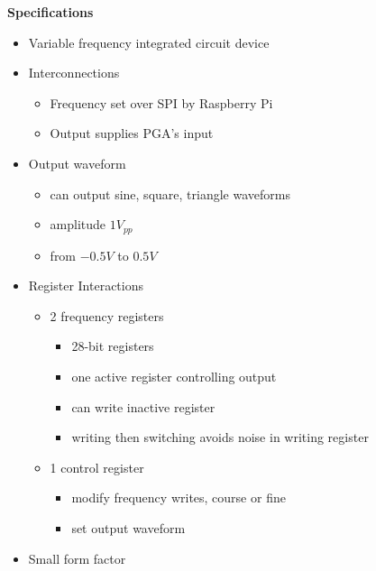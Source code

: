 \documentclass[25pt, a0paper, portrait, margin=0mm, innermargin=15mm, blockverticalspace=15mm, colspace=15mm, subcolspace=8mm]{tikzposter}
\begin{document}
\begin{columns}
{\begin{multicols}{2}
\textbf{Specifications}
\begin{itemize}
\item Variable frequency integrated circuit device
\item Interconnections
  \begin{itemize}
  \item Frequency set over SPI by Raspberry Pi
  \item Output supplies PGA's input
  \end{itemize}
\item Output waveform
  \begin{itemize}
  \item can output sine, square, triangle waveforms
  \item amplitude $1V_{pp}$
  \item from $-0.5V$ to $0.5V$ 
  \end{itemize}
\item Register Interactions
  \begin{itemize}
  \item 2 frequency registers
    \begin{itemize}
    \item 28-bit registers
    \item one active register controlling output
    \item can write inactive register
    \item writing then switching avoids noise in writing register
    \end{itemize}
  \item 1 control register 
    \begin{itemize}
    \item modify frequency writes, course or fine
    \item set output waveform
    \end{itemize}
  \end{itemize}
\item Small form factor
\end{itemize}




\end{multicols}}
\end{columns}
\end{document}
